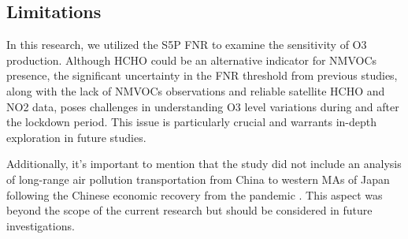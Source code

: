 \subsection{Limitations}
In this research, we utilized the S5P FNR to examine the sensitivity of O3 production. Although HCHO could be an alternative indicator for NMVOCs presence, the significant uncertainty in the FNR threshold from previous studies, along with the lack of NMVOCs observations and reliable satellite HCHO and NO2 data, poses challenges in understanding O3 level variations during and after the lockdown period. This issue is particularly crucial and warrants in-depth exploration in future studies. \par
Additionally, it's important to mention that the study did not include an analysis of long-range air pollution transportation from China to western MAs of Japan following the Chinese economic recovery from the pandemic \citep{itahashi2022returning}. This aspect was beyond the scope of the current research but should be considered in future investigations. \par


